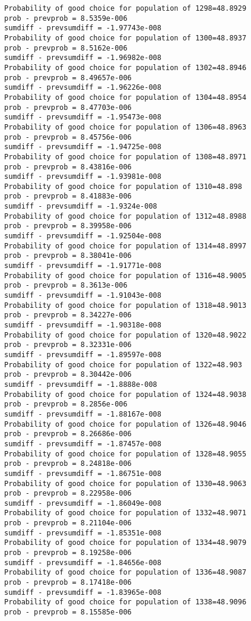 \documentclass[11pt,onecolumn]{article}
\begin{document}
\begin{verbatim}
Probability of good choice for population of 1298=48.8929
prob - prevprob = 8.5359e-006
sumdiff - prevsumdiff = -1.97743e-008
Probability of good choice for population of 1300=48.8937
prob - prevprob = 8.5162e-006
sumdiff - prevsumdiff = -1.96982e-008
Probability of good choice for population of 1302=48.8946
prob - prevprob = 8.49657e-006
sumdiff - prevsumdiff = -1.96226e-008
Probability of good choice for population of 1304=48.8954
prob - prevprob = 8.47703e-006
sumdiff - prevsumdiff = -1.95473e-008
Probability of good choice for population of 1306=48.8963
prob - prevprob = 8.45756e-006
sumdiff - prevsumdiff = -1.94725e-008
Probability of good choice for population of 1308=48.8971
prob - prevprob = 8.43816e-006
sumdiff - prevsumdiff = -1.93981e-008
Probability of good choice for population of 1310=48.898
prob - prevprob = 8.41883e-006
sumdiff - prevsumdiff = -1.9324e-008
Probability of good choice for population of 1312=48.8988
prob - prevprob = 8.39958e-006
sumdiff - prevsumdiff = -1.92504e-008
Probability of good choice for population of 1314=48.8997
prob - prevprob = 8.38041e-006
sumdiff - prevsumdiff = -1.91771e-008
Probability of good choice for population of 1316=48.9005
prob - prevprob = 8.3613e-006
sumdiff - prevsumdiff = -1.91043e-008
Probability of good choice for population of 1318=48.9013
prob - prevprob = 8.34227e-006
sumdiff - prevsumdiff = -1.90318e-008
Probability of good choice for population of 1320=48.9022
prob - prevprob = 8.32331e-006
sumdiff - prevsumdiff = -1.89597e-008
Probability of good choice for population of 1322=48.903
prob - prevprob = 8.30442e-006
sumdiff - prevsumdiff = -1.8888e-008
Probability of good choice for population of 1324=48.9038
prob - prevprob = 8.2856e-006
sumdiff - prevsumdiff = -1.88167e-008
Probability of good choice for population of 1326=48.9046
prob - prevprob = 8.26686e-006
sumdiff - prevsumdiff = -1.87457e-008
Probability of good choice for population of 1328=48.9055
prob - prevprob = 8.24818e-006
sumdiff - prevsumdiff = -1.86751e-008
Probability of good choice for population of 1330=48.9063
prob - prevprob = 8.22958e-006
sumdiff - prevsumdiff = -1.86049e-008
Probability of good choice for population of 1332=48.9071
prob - prevprob = 8.21104e-006
sumdiff - prevsumdiff = -1.85351e-008
Probability of good choice for population of 1334=48.9079
prob - prevprob = 8.19258e-006
sumdiff - prevsumdiff = -1.84656e-008
Probability of good choice for population of 1336=48.9087
prob - prevprob = 8.17418e-006
sumdiff - prevsumdiff = -1.83965e-008
Probability of good choice for population of 1338=48.9096
prob - prevprob = 8.15585e-006

\end{verbatim}
\end{document}

